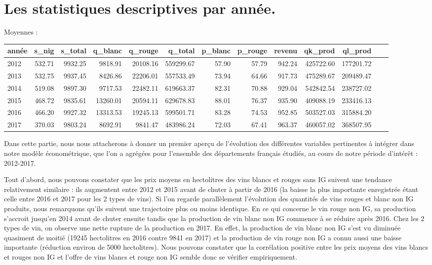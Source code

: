 \documentclass[11pt, a4paper]{article}
\begin{document}
\section*{Les statistiques descriptives par année.}
\par
Moyennes :
\FloatBarrier
\hskip-2.0cm\begin{tabular}{lrrrrrrrrrrrr}
  \hline
  année & s\_nig & s\_total & q\_blanc & q\_rouge & q\_total & p\_blanc & p\_rouge & revenu & qk\_prod & ql\_prod \\ 
  \hline
  2012 & 532.71 & 9932.25 & 9818.91 & 20108.16 & 559299.67 & 57.90 & 57.79 & 942.24 & 425722.60 & 177201.72 \\ 
  2013 & 532.75 & 9937.45 & 8426.86 & 22206.01 & 557533.49 & 73.94 & 64.66 & 917.73 & 475289.67 & 209489.47 \\ 
  2014 & 519.08 & 9897.30 & 9717.53 & 22482.11 & 619663.37 & 82.31 & 70.88 & 929.04 & 542842.54 & 238727.02 \\ 
  2015 & 468.72 & 9835.61 & 13260.01 & 20594.11 & 629678.83 & 88.01 & 76.37 & 935.90 & 409088.19 & 233416.13 \\ 
  2016 & 466.20 & 9927.32 & 13313.53 & 19245.13 & 599501.71 & 83.28 & 74.53 & 952.85 & 503527.03 & 315884.20 \\ 
  2017 & 370.03 & 9803.24 & 8692.91 & 9841.47 & 483986.24 & 72.03 & 67.41 & 963.37 & 460057.02 & 368507.95 \\ 
   \hline
\end{tabular} 
\FloatBarrier
Dans cette partie, nous nous attacherons à donner un premier aperçu de l’évolution des différentes variables pertinentes à intégrer dans notre modèle économétrique, que l’on a agrégées pour l’ensemble des départements français étudiés, au cours de notre période d’intérêt : 2012-2017. 
\par
Tout d’abord, nous pouvons constater que les prix moyens  en hectolitres des vins blancs et rouges sans IG suivent une tendance relativement  similaire : ils augmentent entre 2012 et 2015 avant de chuter à partir de 2016 (la baisse la plus importante enregistrée étant celle entre 2016 et 2017 pour les 2 types de vins). Si l’on regarde parallèlement l’évolution des quantités de vins rouges et blanc non IG produits, nous remarquons qu’ils suivent une trajectoire plus ou moins identique. En ce qui concerne le vin rouge non IG, sa production s’accroit jusqu’en 2014 avant de chuter ensuite tandis que la production de vin blanc non IG commence à se réduire après 2016. Chez les 2 types de vin, on observe une nette rupture de la production en 2017. En effet, la production de vin blanc non IG s’est vu diminuée quasiment de moitié (19245 hectolitres en 2016 contre 9841 en 2017) et la production de vin rouge non IG a connu aussi une baisse importante (réduction environ de 5000 hectolitres).  Nous pouvons  constater que la corrélation positive entre les prix moyens des vins blancs et rouges non IG et l’offre de vins blancs et rouge non IG semble donc se vérifier empiriquement.
\end{document}
